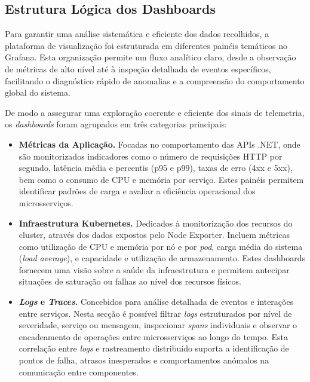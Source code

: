 \subsection{Estrutura Lógica dos Dashboards}

Para garantir uma análise sistemática e eficiente dos dados recolhidos, a plataforma de visualização foi estruturada em diferentes painéis temáticos no Grafana. Esta organização permite um fluxo analítico claro, desde a observação de métricas de alto nível até à inspeção detalhada de eventos específicos, facilitando o diagnóstico rápido de anomalias e a compreensão do comportamento global do sistema.

De modo a assegurar uma exploração coerente e eficiente dos sinais de telemetria, os \textit{dashboards} foram agrupados em três categorias principais:

\begin{itemize}
    \item \textbf{Métricas da Aplicação.} Focadas no comportamento das APIs .NET, onde são monitorizados indicadores como o número de requisições HTTP por segundo, latência média e percentis (p95 e p99), taxas de erro (4xx e 5xx), bem como o consumo de CPU e memória por serviço. Estes painéis permitem identificar padrões de carga e avaliar a eficiência operacional dos microsserviços.
    
    \item \textbf{Infraestrutura Kubernetes.} Dedicados à monitorização dos recursos do cluster, através dos dados expostos pelo Node Exporter. Incluem métricas como utilização de CPU e memória por nó e por \textit{pod}, carga média do sistema (\textit{load average}), e capacidade e utilização de armazenamento. Estes dashboards fornecem uma visão sobre a saúde da infraestrutura e permitem antecipar situações de saturação ou falhas ao nível dos recursos físicos.
    
    \item \textbf{\textit{Logs} e \textit{Traces}.} Concebidos para análise detalhada de eventos e interações entre serviços. Nesta secção é possível filtrar \textit{logs} estruturados por nível de severidade, serviço ou mensagem, inspecionar \textit{spans} individuais e observar o encadeamento de operações entre microsserviços ao longo do tempo. Esta correlação entre \textit{ logs} e rastreamento distribuído suporta a identificação de pontos de falha, atrasos inesperados e comportamentos anómalos na comunicação entre componentes.
\end{itemize}

